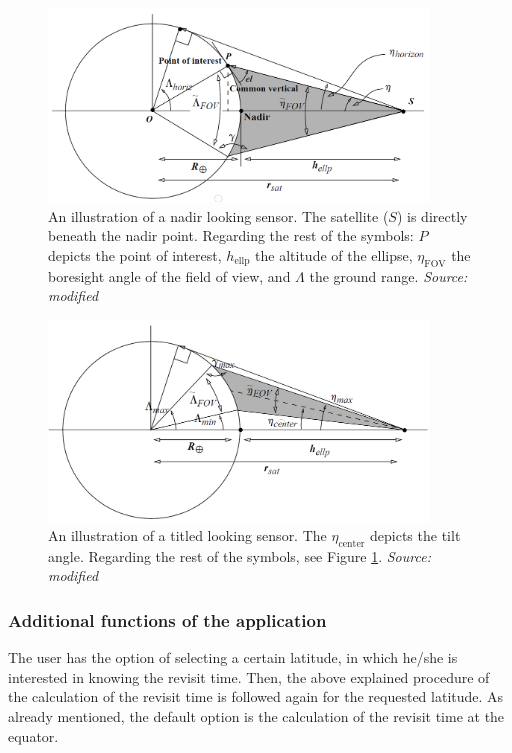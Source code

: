 \begin{figure}
\centering
\includegraphics[width=0.9\textwidth]{Images/nadir_looking.png}\caption{An illustration of a nadir looking sensor. The satellite ($S$) is directly beneath the nadir point. Regarding the rest of the symbols: $P$ depicts the point of interest, $h_{\text{ellp}}$ the altitude of the ellipse, $\eta_{\text{FOV}}$ the boresight angle of the field of view, and $\Lambda$ the ground range. \textit{Source: modified \cite{Vallado}}}
\label{nadir_looking}
\end{figure}

\begin{figure}
\centering
\includegraphics[width=0.9\textwidth]{Images/tilted_looking.png}\caption{An illustration of a titled looking sensor. The $\eta_{\text{center}}$ depicts the tilt angle. Regarding the rest of the symbols, see Figure \ref{nadir_looking}. \textit{Source: modified \cite{Vallado}}}
\label{tilted_looking}
\end{figure}

\bigskip
\subsubsection{Additional functions of the application}
\bigskip
The user has the option of selecting a certain latitude, in which he/she is interested in knowing the revisit time. Then, the above explained procedure of the calculation of the revisit time is followed again for the requested latitude. As already mentioned, the default option is the calculation of the revisit time at the equator.

